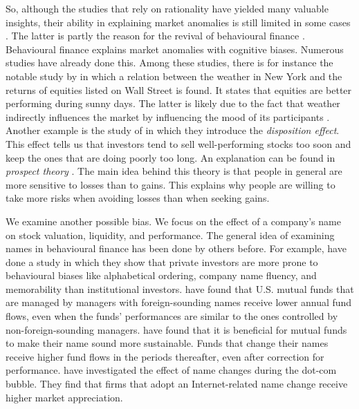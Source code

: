 \documentclass[11pt]{article}
\begin{document}
So, although the studies that rely on rationality have yielded many valuable insights, their ability in explaining market anomalies is still limited in some cases \citep{subrahmanyam2008behavioural}. The latter is partly the reason for the revival of behavioural finance \citep{kapoor2017behavioural}. Behavioural finance explains market anomalies with cognitive biases. Numerous studies have already done this. Among these studies, there is for instance the notable study by \cite{saunders1993stock} in which a relation between the weather in New York and the returns of equities listed on Wall Street is found. It states that equities are better performing during sunny days. The latter is likely due to the fact that weather indirectly influences the market by influencing the mood of its participants \citep{cunningham1979weather}. Another example is the study of \cite{shefrin1985disposition} in which they introduce the \textit{disposition effect}. This effect tells us that investors tend to sell well-performing stocks too soon and keep the ones that are doing poorly too long. An explanation can be found in \textit{prospect theory} \citep{kai1979prospect}. The main idea behind this theory is that people in general are more sensitive to losses than to gains. This explains why people are willing to take more risks when avoiding losses than when seeking gains.

We examine  another possible bias. We focus on the effect of a company's name on stock valuation, liquidity, and performance. The general idea of examining names in behavioural finance has been done by others before. For example, \cite{itzkowitz2017name} have done a study in which they show that private investors are more prone to behavioural biases like alphabetical ordering, company name fluency, and memorability than institutional investors.
\cite{kumar2015s} have found that U.S. mutual funds that are managed by managers with foreign-sounding names receive lower annual fund flows, even when the funds' performances are similar to the ones controlled by non-foreign-sounding managers. \cite{el2021s} have found that it is beneficial for mutual funds to make their name sound more sustainable. Funds that change their names receive higher fund flows in the periods thereafter, even after correction for performance. \cite{cooper2001rose} have investigated the effect of name changes during the dot-com bubble. They find that firms that adopt an Internet-related name change receive higher market appreciation.
\end{document}
